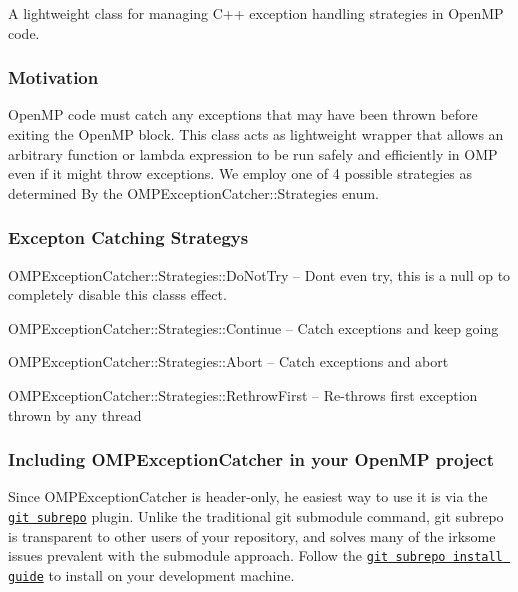 A lightweight class for managing C++ exception handling strategies in Open\+MP code.

\subsubsection*{Motivation}

Open\+MP code must catch any exceptions that may have been thrown before exiting the Open\+MP block. This class acts as lightweight wrapper that allows an arbitrary function or lambda expression to be run safely and efficiently in O\+MP even if it might throw exceptions. We employ one of 4 possible strategies as determined By the O\+M\+P\+Exception\+Catcher\+::\+Strategies enum.

\subsubsection*{Excepton Catching Strategy\textquotesingle{}s}


\begin{DoxyItemize}
\item {\ttfamily O\+M\+P\+Exception\+Catcher\+::\+Strategies\+::\+Do\+Not\+Try} -- Don\textquotesingle{}t even try, this is a null op to completely disable this class\textquotesingle{}s effect.
\item {\ttfamily O\+M\+P\+Exception\+Catcher\+::\+Strategies\+::\+Continue} -- Catch exceptions and keep going
\item {\ttfamily O\+M\+P\+Exception\+Catcher\+::\+Strategies\+::\+Abort} -- Catch exceptions and abort
\item {\ttfamily O\+M\+P\+Exception\+Catcher\+::\+Strategies\+::\+Rethrow\+First} -- Re-\/throws first exception thrown by any thread
\end{DoxyItemize}

\subsubsection*{Including O\+M\+P\+Exception\+Catcher in your Open\+MP project}

Since O\+M\+P\+Exception\+Catcher is header-\/only, he easiest way to use it is via the \href{https://github.com/ingydotnet/git-subrepo}{\tt git subrepo} plugin. Unlike the traditional {\ttfamily git submodule} command, {\ttfamily git subrepo} is transparent to other users of your repository, and solves many of the irksome issues prevalent with the submodule approach. Follow the \href{https://github.com/ingydotnet/git-subrepo#installation-instructions}{\tt git subrepo install guide} to install on your development machine.

